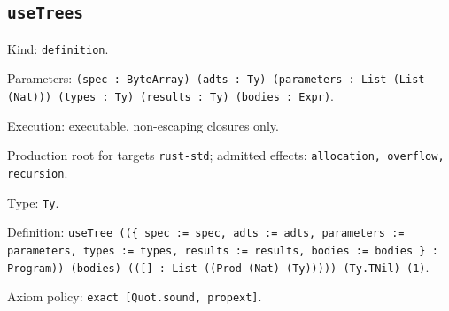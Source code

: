 \documentclass[11pt]{article}
\begin{document}
\subsection*{\texttt{useTrees}}
\noindent Kind: \texttt{definition}.\par
\noindent Parameters: \texttt{(spec : ByteArray) (adts : Ty) (parameters : List (List (Nat))) (types : Ty) (results : Ty) (bodies : Expr)}.\par
\noindent Execution: executable, non-escaping closures only.\par
\noindent Production root for targets \texttt{rust-std}; admitted effects: \texttt{allocation, overflow, recursion}.\par
\noindent Type: \texttt{Ty}.\par
\noindent Definition: \texttt{useTree ((\{ spec := spec, adts := adts, parameters := parameters, types := types, results := results, bodies := bodies \} : Program)) (bodies) (([] : List ((Prod (Nat) (Ty))))) (Ty.TNil) (1)}.\par
\noindent Axiom policy: \texttt{exact [Quot.sound, propext]}.\par
\end{document}
